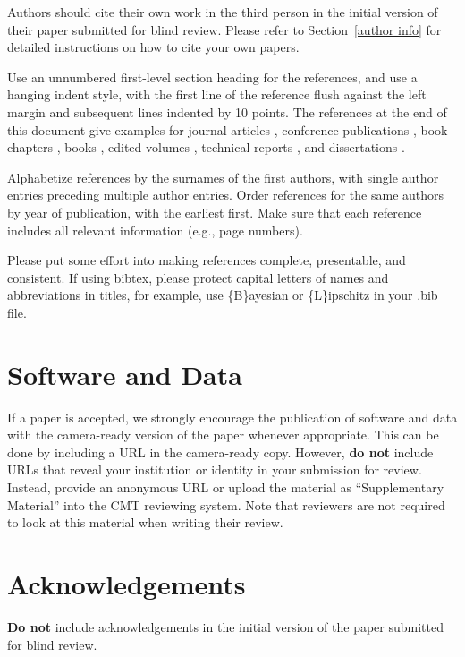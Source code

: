 \documentclass{article}
\begin{document}
Authors should cite their own work in the third person
in the initial version of their paper submitted for blind review.
Please refer to Section~\ref{author info} for detailed instructions on how to
cite your own papers.

Use an unnumbered first-level section heading for the references, and use a
hanging indent style, with the first line of the reference flush against the
left margin and subsequent lines indented by 10 points. The references at the
end of this document give examples for journal articles \cite{Samuel59},
conference publications \cite{langley00}, book chapters \cite{Newell81}, books
\cite{DudaHart2nd}, edited volumes \cite{MachineLearningI}, technical reports
\cite{mitchell80}, and dissertations \cite{kearns89}.

Alphabetize references by the surnames of the first authors, with
single author entries preceding multiple author entries. Order
references for the same authors by year of publication, with the
earliest first. Make sure that each reference includes all relevant
information (e.g., page numbers).

Please put some effort into making references complete, presentable, and
consistent. If using bibtex, please protect capital letters of names and
abbreviations in titles, for example, use \{B\}ayesian or \{L\}ipschitz
in your .bib file.

\section*{Software and Data}

If a paper is accepted, we strongly encourage the publication of software and data with the
camera-ready version of the paper whenever appropriate. This can be
done by including a URL in the camera-ready copy. However, \textbf{do not}
include URLs that reveal your institution or identity in your
submission for review. Instead, provide an anonymous URL or upload
the material as ``Supplementary Material'' into the CMT reviewing
system. Note that reviewers are not required to look at this material
when writing their review.

\section*{Acknowledgements}

\textbf{Do not} include acknowledgements in the initial version of
the paper submitted for blind review.
\end{document}

